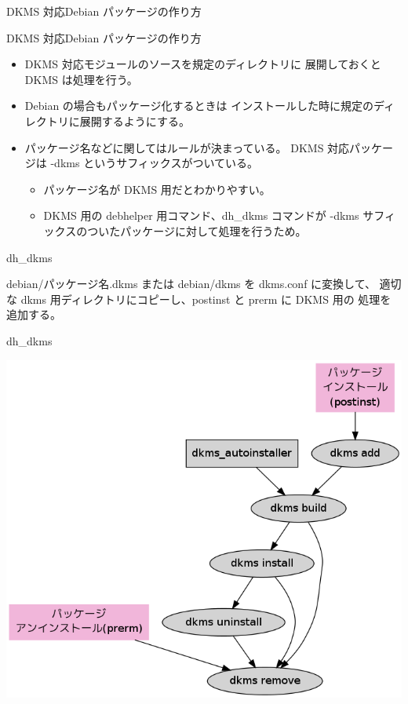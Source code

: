 \begin{frame}
\large\bfseries
\begin{center}
DKMS 対応Debian パッケージの作り方
\end{center}
\end{frame}

\begin{frame}{DKMS 対応Debian パッケージの作り方}

\begin{itemize}
\item DKMS 対応モジュールのソースを規定のディレクトリに
展開しておくと DKMS は処理を行う。
\item Debian の場合もパッケージ化するときは
インストールした時に規定のディレクトリに展開するようにする。
\item パッケージ名などに関してはルールが決まっている。
DKMS 対応パッケージは -dkms というサフィックスがついている。\\

\begin{itemize}
\item パッケージ名が DKMS 用だとわかりやすい。
\item DKMS 用の debhelper 用コマンド、dh\_dkms コマンドが 
-dkms サフィックスのついたパッケージに対して処理を行うため。
\end{itemize}
\end{itemize}

\end{frame}


\begin{frame}{dh\_dkms}

debian/パッケージ名.dkms または debian/dkms を dkms.conf に変換して、
適切な dkms 用ディレクトリにコピーし、postinst と prerm に DKMS 用の
処理を追加する。

\end{frame}


\begin{frame}{dh\_dkms}

\begin{center}
  \includegraphics[width=0.8\hsize]{image201202/dkms-debian.png}
\end{center}

\end{frame}


